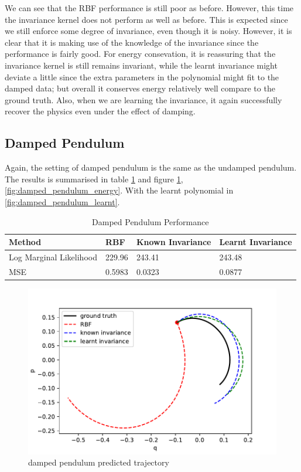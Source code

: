 \documentclass{statsmsc}
\begin{document}
We can see that the RBF performance is still poor as before.
However, this time the invariance kernel does not perform as well as before. 
This is expected since we still enforce some degree of invariance, even though it is noisy. 
However, it is clear that it is making use of the knowledge of the invariance since the performance is fairly good.
For energy consevation, it is reassuring that the invariance kernel is still remains invariant, while the learnt invariance might deviate a little since the extra parameters in the polynomial might fit to the damped data; but overall it conserves energy relatively well compare to the ground truth.
Also, when we are learning the invariance, it again successfully recover the physics even under the effect of damping.

\subsection{Damped Pendulum}
Again, the setting of damped pendulum is the same as the undamped pendulum.
The results is summarised in table \ref{tab:damped_pendulum_performance} and figure \ref{fig:damped_pendulum_prediction}, \ref{fig:damped_pendulum_energy}.
With the learnt polynomial in \ref{fig:damped_pendulum_learnt}.

\begin{table}[H]
  \centering
  \begin{tabular}{l l l l}
    \hline
Method           & RBF & Known Invariance&  Learnt Invariance\\
  \hline
Log Marginal Likelihood & 229.96 & 243.41 & 243.48  \\
MSE & 0.5983 & 0.0323 & 0.0877 \\
    \hline
  \end{tabular}
  \caption{Damped Pendulum Performance}
  \label{tab:damped_pendulum_performance}
\end{table}

\begin{figure}[H]
        \centering
        \includegraphics[width=0.8\linewidth]{../codes/figures/damped_pendulum_predicted.pdf}
        \caption{damped pendulum predicted trajectory}
        \label{fig:damped_pendulum_prediction}
\end{figure}
\end{document}
